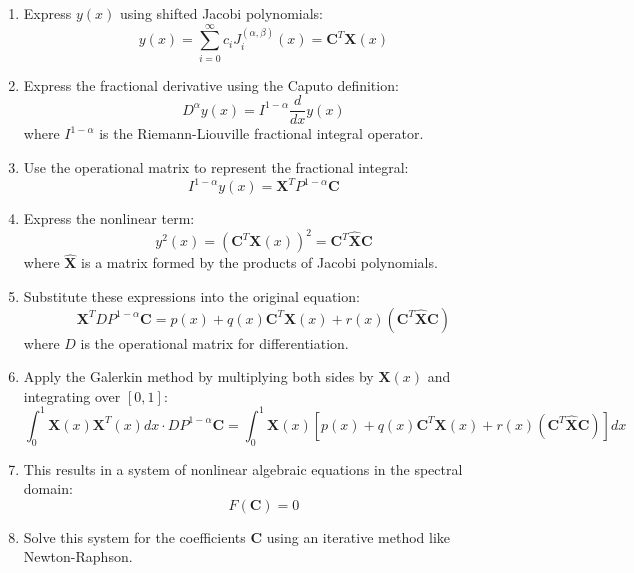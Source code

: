 \documentclass{article}
\begin{document}
\begin{enumerate}
    \item Express $y(x)$ using shifted Jacobi polynomials:
    \begin{equation}
    y(x) = \sum_{i=0}^{\infty} c_i J_i^{(\alpha,\beta)}(x) = \mathbf{C}^T \mathbf{X}(x)
    \end{equation}

    \item Express the fractional derivative using the Caputo definition:
    \begin{equation}
    D^\alpha y(x) = I^{1-\alpha} \frac{d}{dx} y(x)
    \end{equation}
    where $I^{1-\alpha}$ is the Riemann-Liouville fractional integral operator.

    \item Use the operational matrix to represent the fractional integral:
    \begin{equation}
    I^{1-\alpha} y(x) = \mathbf{X}^T P^{1-\alpha} \mathbf{C}
    \end{equation}

    \item Express the nonlinear term:
    \begin{equation}
    y^2(x) = (\mathbf{C}^T \mathbf{X}(x))^2 = \mathbf{C}^T \hat{\mathbf{X}} \mathbf{C}
    \end{equation}
    where $\hat{\mathbf{X}}$ is a matrix formed by the products of Jacobi polynomials.

    \item Substitute these expressions into the original equation:
    \begin{equation}
    \mathbf{X}^T D P^{1-\alpha} \mathbf{C} = p(x) + q(x)\mathbf{C}^T \mathbf{X}(x) + r(x)(\mathbf{C}^T \hat{\mathbf{X}} \mathbf{C})
    \end{equation}
    where $D$ is the operational matrix for differentiation.

    \item Apply the Galerkin method by multiplying both sides by $\mathbf{X}(x)$ and integrating over $[0,1]$:
    \begin{equation}
    \int_0^1 \mathbf{X}(x) \mathbf{X}^T(x) dx \cdot D P^{1-\alpha} \mathbf{C} = \int_0^1 \mathbf{X}(x) [p(x) + q(x)\mathbf{C}^T \mathbf{X}(x) + r(x)(\mathbf{C}^T \hat{\mathbf{X}} \mathbf{C})] dx
    \end{equation}

    \item This results in a system of nonlinear algebraic equations in the spectral domain:
    \begin{equation}
    F(\mathbf{C}) = 0
    \end{equation}

    \item Solve this system for the coefficients $\mathbf{C}$ using an iterative method like Newton-Raphson.
\end{enumerate}
\end{document}
